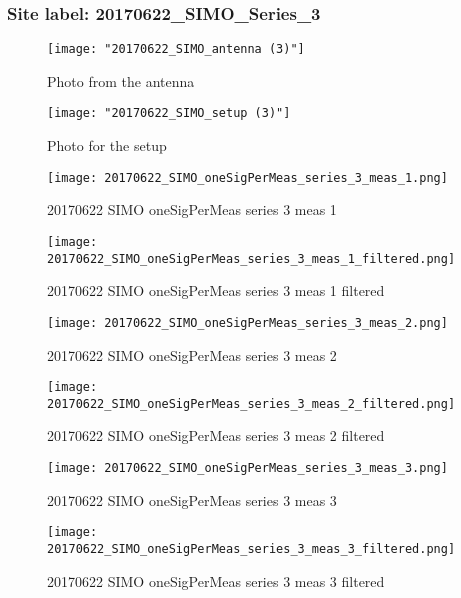 \subsubsection{Site label: 20170622\_SIMO\_Series\_3}
\begin{figure}[ht] \caption{Photo from the antenna}
\texttt{[image: "20170622\_SIMO\_antenna (3)"]}\centering\end{figure}
\begin{figure}[ht] \caption{Photo for the setup}
\texttt{[image: "20170622\_SIMO\_setup (3)"]}\centering\end{figure}
\begin{figure}[ht] \caption{20170622 SIMO oneSigPerMeas series 3 meas 1}
\texttt{[image: 20170622\_SIMO\_oneSigPerMeas\_series\_3\_meas\_1.png]}\centering\end{figure}
\begin{figure}[ht] \caption{20170622 SIMO oneSigPerMeas series 3 meas 1 filtered}
\texttt{[image: 20170622\_SIMO\_oneSigPerMeas\_series\_3\_meas\_1\_filtered.png]}\centering\end{figure}
\begin{figure}[ht] \caption{20170622 SIMO oneSigPerMeas series 3 meas 2}
\texttt{[image: 20170622\_SIMO\_oneSigPerMeas\_series\_3\_meas\_2.png]}\centering\end{figure}
\begin{figure}[ht] \caption{20170622 SIMO oneSigPerMeas series 3 meas 2 filtered}
\texttt{[image: 20170622\_SIMO\_oneSigPerMeas\_series\_3\_meas\_2\_filtered.png]}\centering\end{figure}
\begin{figure}[ht] \caption{20170622 SIMO oneSigPerMeas series 3 meas 3}
\texttt{[image: 20170622\_SIMO\_oneSigPerMeas\_series\_3\_meas\_3.png]}\centering\end{figure}
\begin{figure}[ht] \caption{20170622 SIMO oneSigPerMeas series 3 meas 3 filtered}
\texttt{[image: 20170622\_SIMO\_oneSigPerMeas\_series\_3\_meas\_3\_filtered.png]}\centering\end{figure}
\clearpage
